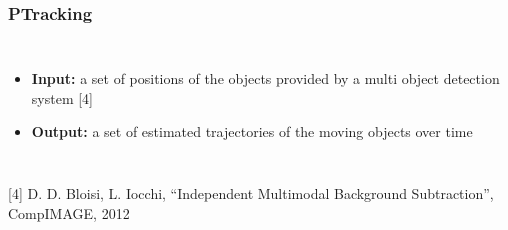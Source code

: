 \begin{frame}
	\frametitle{PTracking}
	
	\vspace{0.15cm}
	
	\begin{columns}[T]
		
		\vspace{0.8cm}
		
		\begin{itemize}
			\item \textbf{Input:} a set of positions of the objects provided by a multi
				  object detection system [4]
			
			\vspace{1.6cm}
			
			\item \textbf{Output:} a set of estimated trajectories of the moving objects
				  over time
		\end{itemize}
		
		\centering
		
	\end{columns}
	
	\vspace{0.3cm}
	
	\tiny
	
	[4] D. D. Bloisi, L. Iocchi, ``Independent Multimodal Background Subtraction'',
		CompIMAGE, 2012
\end{frame}

